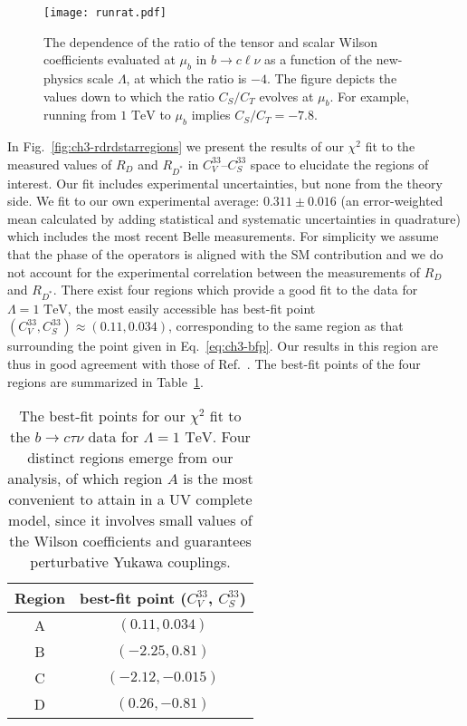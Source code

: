 \begin{figure}[t]
  \centering%
\centering \texttt{[image: runrat.pdf]}
\caption[The dependence of the ratio of the tensor and scalar Wilson
coefficients evaluated at $\mu_b$ in $b \to c \ell \nu$ as a function of the
new-physics scale $\Lambda$, at which the ratio is $-4$.]{The dependence of the
  ratio of the tensor and scalar Wilson coefficients evaluated at $\mu_b$ in
  $b \to c \ell \nu$ as a function of the new-physics scale $\Lambda$, at which
  the ratio is $-4$. The figure depicts the values down to which the ratio
  $C_S/C_T$ evolves at $\mu_b$. For example, running from $1 \text{ TeV}$ to
  $\mu_b$ implies $C_S/C_T= -7.8$.}
\label{fig:ch3-runrat}
\end{figure}

In Fig.~\ref{fig:ch3-rdrdstarregions} we present the results of our $\chi^2$ fit to
the measured values of $R_D$ and $R_{D^{*}}$ in $C^{33}_V$--$C^{33}_S$ space to
elucidate the regions of interest. Our fit includes experimental uncertainties,
but none from the theory side. We fit to our own experimental average: $0.311
\pm 0.016$ (an error-weighted mean calculated by adding statistical and
systematic uncertainties in quadrature) which includes the most recent Belle
measurements. For simplicity we assume that the phase of the operators is
aligned with the SM contribution and we do not account for the experimental
correlation between the measurements of $R_D$ and $R_{D^{*}}$. There exist four
regions which provide a good fit to the data for $\Lambda = 1 \text{ TeV}$, the
most easily accessible has best-fit point $(C_V^{33}, C_S^{33}) \approx (0.11,
0.034)$, corresponding to the same region as that surrounding the point given in
Eq.~\eqref{eq:ch3-bfp}. Our results in this region are thus in good agreement with
those of Ref.~\cite{Freytsis:2015qca}. The best-fit points of the four regions
are summarized in Table~\ref{tbl:ch3-bfpts}.

\begin{table}[t]
  \centering
  \begin{tabular}{cc}
    \toprule
    Region & best-fit point ($C_V^{33}$, $C_S^{33}$)\\
    \midrule
    A & $(0.11, 0.034)$ \\
    B & $(-2.25, 0.81)$ \\
    C & $(-2.12, -0.015)$ \\
    D & $(0.26, -0.81)$ \\
    \bottomrule
  \end{tabular}
  \caption[The best-fit points for our $\chi^2$ fit to the $b \to c \tau \nu$
  data for $\Lambda = 1 \text{ TeV}$.]{The best-fit points for our $\chi^2$ fit
    to the $b \to c \tau \nu$ data for $\Lambda = 1 \text{ TeV}$. Four distinct
    regions emerge from our analysis, of which region $A$ is the most convenient
    to attain in a UV complete model, since it involves small values of the
    Wilson coefficients and guarantees perturbative Yukawa couplings.}
  \label{tbl:ch3-bfpts}
\end{table}

